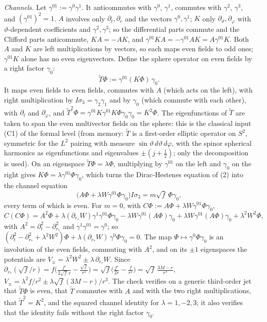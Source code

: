\emph{Channels.} Let $\gamma^{01} := \gamma^{0}\gamma^{1}$. It anticommutes with $\gamma^{0}$, $\gamma^{1}$, commutes with $\gamma^{2}$, $\gamma^{3}$, and $(\gamma^{01})^{2} = 1$. $A$ involves only $\partial_{t}, \partial_{r}$ and the vectors $\gamma^{0}, \gamma^{1}$; $K$ only $\partial_{\vartheta}, \partial_{\varphi}$ with $\vartheta$-dependent coefficients and $\gamma^{2}, \gamma^{3}$; so the differential parts commute and the Clifford parts anticommute, $KA = -AK$, and $\gamma^{01}KA = -\gamma^{01}AK = A\gamma^{01}K$. Both $A$ and $K$ are left multiplications by vectors, so each maps even fields to odd ones; $\gamma^{01}K$ alone has no even eigenvectors. Define the sphere operator on even fields by a right factor $\gamma_{0}$:
\[
\tilde T\Phi := \gamma^{01}(K\Phi)\,\gamma_{0} .
\]
It maps even fields to even fields, commutes with $A$ (which acts on the left), with right multiplication by $I\sigma_{3} = \gamma_{2}\gamma_{1}$ and by $\gamma_{0}$ (which commute with each other), with $\partial_{t}$ and $\partial_{\varphi}$, and $\tilde T^{2}\Phi = \gamma^{01}K\gamma^{01}K\Phi\gamma_{0}\gamma_{0} = K^{2}\Phi$. The eigenfunctions of $\tilde T$ are taken to span the even multivector fields on the sphere: this is the classical input (C1) of the formal level (from memory: $\tilde T$ is a first-order elliptic operator on $S^{2}$, symmetric for the $L^{2}$ pairing with measure $\sin\vartheta\,d\vartheta\,d\varphi$, with the spinor spherical harmonics as eigenfunctions and eigenvalues $\pm(j + \tfrac12)$; only the decomposition is used). On an eigenspace $\tilde T\Phi = \lambda\Phi$, multiplying by $\gamma^{01}$ on the left and $\gamma_{0}$ on the right gives $K\Phi = \lambda\gamma^{01}\Phi\gamma_{0}$, which turns the Dirac-Hestenes equation of (2) into the channel equation
\[
\bigl(A\Phi + \lambda W\gamma^{01}\Phi\gamma_{0}\bigr)I\sigma_{3} = m\sqrt f\,\Phi\gamma_{0},
\]
every term of which is even. For $m = 0$, with $C\Phi := A\Phi + \lambda W\gamma^{01}\Phi\gamma_{0}$,
\[
C(C\Phi) = A^{2}\Phi + \lambda(\partial_{r_{*}}W)\gamma^{1}\gamma^{01}\Phi\gamma_{0} - \lambda W\gamma^{01}(A\Phi)\gamma_{0} + \lambda W\gamma^{01}(A\Phi)\gamma_{0} + \lambda^{2}W^{2}\Phi ,
\]
with $A^{2} = \partial_{t}^{2} - \partial_{r_{*}}^{2}$ and $\gamma^{1}\gamma^{01} = \gamma^{0}$; so $(\partial_{t}^{2} - \partial_{r_{*}}^{2} + \lambda^{2}W^{2})\Phi + \lambda(\partial_{r_{*}}W)\,\gamma^{0}\Phi\gamma_{0} = 0$. The map $\Phi \mapsto \gamma^{0}\Phi\gamma_{0}$ is an involution of the even fields, commuting with $A^{2}$, and on its $\pm1$ eigenspaces the potentials are $V_{\pm} = \lambda^{2}W^{2} \pm \lambda\,\partial_{r_{*}}W$. Since $\partial_{r_{*}}(\sqrt f/r) = f\bigl(\tfrac{f'}{2\sqrt f\,r} - \tfrac{\sqrt f}{r^{2}}\bigr) = \sqrt f\bigl(\tfrac{f'}{2r} - \tfrac{f}{r^{2}}\bigr) = \sqrt f\,\tfrac{3M - r}{r^{3}}$, $V_{\pm} = \lambda^{2}f/r^{2} \pm \lambda\sqrt f(3M - r)/r^{3}$. The check verifies on a generic third-order jet that $\tilde T\Phi$ is even, that $\tilde T$ commutes with $A$ and with the two right multiplications, that $\tilde T^{2} = K^{2}$, and the squared channel identity for $\lambda = 1, -2, 3$; it also verifies that the identity fails without the right factor $\gamma_{0}$.

